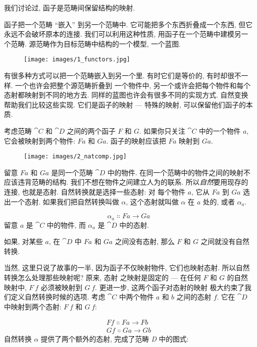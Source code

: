 
\lettrine[lhang=0.17]{我}{们讨论过,} 函子是范畴间保留结构的映射.

函子把一个范畴 ``嵌入'' 到另一个范畴中. 它可能把多个东西折叠成一个东西, 但它永远不会破坏原本的连接.
我们可以利用这种性质, 用函子在一个范畴中建模另一个范畴. 源范畴作为目标范畴中结构的一个模型, 一个蓝图.

\begin{figure}[H]
  \centering\texttt{[image: images/1\_functors.jpg]}
\end{figure}

\noindent
有很多种方式可以把一个范畴嵌入到另一个里. 有时它们是等价的, 有时却很不一样. 一个也许会把整个源范畴折叠到
一个物件中, 另一个或许会把每个物件和每个态射都映射到不同的地方去. 同样的蓝图也许会有很多不同的实现方式.
自然变换帮助我们比较这些实现. 它们是函子的映射 --- 特殊的映射, 可以保留他们函子的本质.

考虑范畴 $\cat{C}$ 和 $\cat{D}$ 之间的两个函子 $F$ 和 $G$. 如果你只关注 $\cat{C}$ 中的一个物件 $a$,
它会被映射到两个物件: $F a$ 和 $G a$. 函子的映射应该把 $F a$ 映射到 $G a$.

\begin{figure}[H]
  \centering
  \texttt{[image: images/2\_natcomp.jpg]}
\end{figure}

\noindent
留意 $F a$ 和 $G a$ 是同一个范畴 $\cat{D}$ 中的物件. 在同一个范畴中的物件之间的映射不应该违背范畴的结构.
我们不想在物件之间建立人为的联系. 所以\emph{自然}要用现存的连接, 也就是态射. 自然转换就是选择一些态射: 对
每个物件 $a$, 它从 $F a$ 到 $G a$ 选出一个态射. 如果我们把自然转换叫做 $\alpha$, 这个态射就叫做 $\alpha$
在 $a$ 处的, 或者 $\alpha_a$.

\[\alpha_a \Colon F a \to G a\]
留意 $a$ 是 $\cat{C}$ 中的物件, 而 $\alpha_a$ 是 $\cat{D}$ 中的态射.

如果, 对某些 $a$, 在 $\cat{D}$ 中 $F a$ 和 $G a$ 之间没有态射, 那么 $F$ 和 $G$ 之间就没有自然转换.

当然, 这里只说了故事的一半, 因为函子不仅映射物件, 它们也映射态射. 所以自然转换怎么处理那些映射呢? 原来, 态射
之映射是固定的 --- 在任何 $F$ 和 $G$ 的自然映射中, $F\ f$ 必须被映射到 $G\ f$. 更进一步, 这两个函子对态射的映射
极大约束了我们定义自然转换时候的选项. 考虑 $\cat{C}$ 中两个物件 $a$ 和 $b$ 之间的态射 $f$. 它在 $\cat{D}$
中映射到两个态射: $F\ f$ 和 $G\ f$:

\begin{gather*}
  F f \Colon F a \to F b \\
  G f \Colon G a \to G b
\end{gather*}
自然转换 $\alpha$ 提供了两个额外的态射, 完成了范畴 \emph{D} 中的图式:

